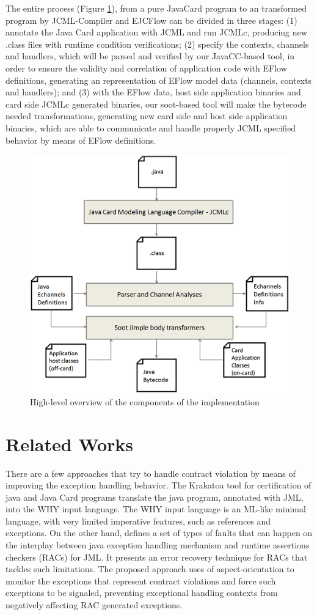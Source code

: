 \documentclass[10pt, conference, compsocconf]{IEEEtran}
\begin{document}
The entire process (Figure \ref{fig:sootEchannel}), from a pure JavaCard program to an
transformed program by JCML-Compiler and EJCFlow can be divided in three stages: (1)
annotate the Java Card application with JCML and run JCMLc, producing new .class
files with runtime condition verifications; (2) specify the contexts, channels
and handlers, which will be parsed and verified by our JavaCC-based tool, in
order to ensure the validity and correlation of application code with EFlow
definitions, generating an representation of EFlow model data (channels,
contexts and handlers); and (3) with the EFlow data, host side application
binaries and card side JCMLc generated binaries, our soot-based tool will make
the bytecode needed transformations, generating new card side and host side
application binaries, which are able to communicate and handle properly JCML
specified behavior by means of EFlow definitions.   
 
\begin{figure}[ht!] 
\centering  
\includegraphics[width=0.45 \textwidth]{figs/SootEchannelProcess} 
\caption{High-level overview of the components of the implementation}
\label{fig:sootEchannel}   
\end{figure} 

\section{Related Works}
\label{sec:relatedWorks}

There are a few approaches that try to handle contract violation by means of
improving the exception handling behavior. The Krakatoa tool \cite{Krakatoa} for
certification of java and Java Card programs translate the java program,
annotated with JML, into the WHY \cite{FilliatreM07} input language. The WHY input language
is an ML-like minimal language, with very limited imperative features, such as
references and exceptions. On the other hand, \cite{Rebelo} defines a set of types of
faults that can happen on the interplay between java exception handling
mechanism and runtime assertions checkers (RACs) for JML. It presents an error
recovery technique for RACs that tackles such limitations. The proposed approach
uses of aspect-orientation to monitor the exceptions that represent contract
violations and force such exceptions to be signaled, preventing exceptional
handling contexts from negatively affecting RAC generated exceptions.   
\end{document}
